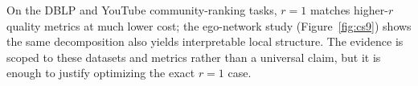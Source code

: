 %

\label{sec:cs-summary}
On the DBLP and YouTube community-ranking tasks, $r{=}1$ matches higher-$r$ quality metrics at much lower cost; the ego-network study (Figure~\ref{fig:cs9}) shows the same decomposition also yields interpretable local structure.
%
The evidence is scoped to these datasets and metrics rather than a universal claim, but it is enough to justify optimizing the exact $r{=}1$ case.
